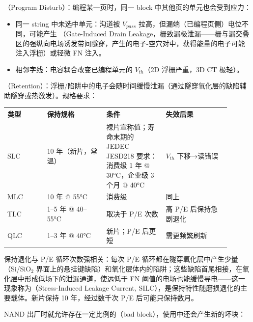 

（Program Disturb）：编程某一页时，同一 block 中其他页的单元也会受到应力：
\begin{itemize}
  \item 同一 string 中未选中单元：沟道被 $V_{pass}$ 拉高，但漏端（已编程页侧）电位不同，可能产生 （Gate-Induced Drain Leakage，栅致漏极泄漏——栅与漏交叠区的强纵向电场诱发带间隧穿，产生的电子-空穴对中，获得能量的电子可能注入浮栅）或轻微 FN 注入。
  \item 相邻字线：电容耦合改变已编程单元的 $V_{th}$（2D 浮栅严重，3D CT 极轻）。
\end{itemize}

（Retention）：浮栅/陷阱中的电子会随时间缓慢泄漏（通过隧穿氧化层的缺陷辅助隧穿或热激发）。规格要求：

\begin{longtable}{L{0.16\linewidth}L{0.24\linewidth}L{0.24\linewidth}L{0.26\linewidth}}
\toprule
类型 & 保持规格 & 条件 & 失效后果 \\
\midrule
SLC & 10 年（新片，常温） & 裸片宣称值；寿命末期的 JEDEC JESD218 要求：消费级 1 年 @ 30°C，企业级 3 个月 @ 40°C & $V_{th}$ 下移→读错误 \\\tablerowrule
MLC & 10 年 @ 55°C & 消费级 & 同上 \\\tablerowrule
TLC & 1--5 年 @ 40--55°C & 取决于 P/E 次数 & 高 P/E 后保持急剧退化 \\\tablerowrule
QLC & 1--3 年 @ 40°C & 新片；P/E 后更短 & 需更频繁刷新 \\
\bottomrule
\end{longtable}

保持退化与 P/E 循环次数强相关：每次 P/E 循环都在隧穿氧化层中产生少量（Si/SiO$_2$ 界面上的悬挂键缺陷）和氧化层体内的陷阱；这些缺陷首尾相接，在氧化层中形成低场下的泄漏通道，使远低于 FN 阈值的电场也能缓慢导电——这一现象称为（Stress-Induced Leakage Current, SILC），是保持特性随磨损退化的主要载体。新片保持 10 年，经过数千次 P/E 后可能只保持数月。


NAND 出厂时就允许存在一定比例的（bad block），使用中还会产生新的坏块：


